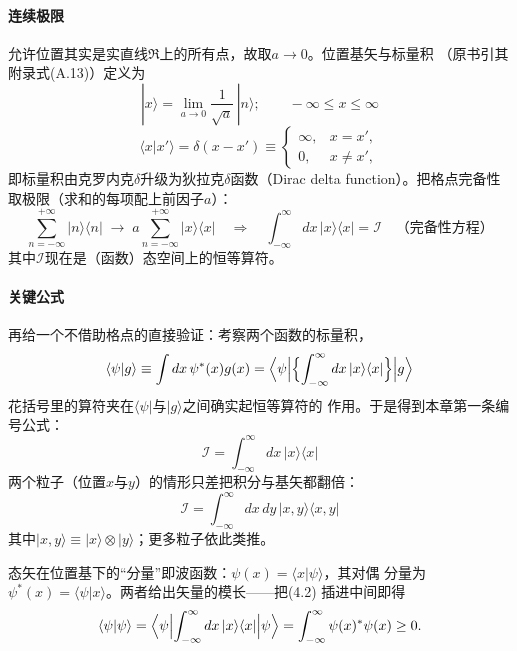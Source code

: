 \paragraph{连续极限}
允许位置其实是实直线$\Re$上的所有点，故取$a\to0$。位置基矢与标量积
（原书引其附录式(A.13)）定义为
\begin{equation*}
|x\rangle=\lim_{a\to0}\frac{1}{\sqrt{a}}\,|n\rangle;\qquad
-\infty\leq x\leq\infty
\end{equation*}
\begin{equation*}
\langle x|x'\rangle=\delta(x-x')\equiv
\begin{cases}
\infty, & x=x',\\
0, & x\neq x',
\end{cases}
\end{equation*}
即标量积由克罗内克$\delta$升级为狄拉克$\delta$函数（Dirac delta
function）。把格点完备性取极限（求和的每项配上前因子$a$）：
\begin{equation*}
\sum_{n=-\infty}^{+\infty}|n\rangle\langle n|
\;\to\;
a\sum_{n=-\infty}^{+\infty}|x\rangle\langle x|
\quad\Longrightarrow\quad
\int_{-\infty}^{\infty}dx\,|x\rangle\langle x|=\mathcal{I}
\quad\text{（完备性方程）}
\end{equation*}
其中$\mathcal{I}$现在是（函数）态空间上的恒等算符。

\paragraph{关键公式}
再给一个不借助格点的直接验证：考察两个函数的标量积，
\begin{equation*}
\langle\psi|g\rangle\equiv\int dx\,\psi^{*}(x)g(x)
=\Bigl\langle\psi\Bigl|
\Bigl\{\int_{-\infty}^{\infty}dx\,|x\rangle\langle x|\Bigr\}
\Bigr|g\Bigr\rangle
\end{equation*}
花括号里的算符夹在$\langle\psi|$与$|g\rangle$之间确实起恒等算符的
作用。于是得到本章第一条编号公式：
\begin{equation*}
\mathcal{I}=\int_{-\infty}^{\infty}dx\,|x\rangle\langle x|
\tag{4.2}
\end{equation*}
两个粒子（位置$x$与$y$）的情形只差把积分与基矢都翻倍：
\begin{equation*}
\mathcal{I}=\int_{-\infty}^{\infty}dx\,dy\,|x,y\rangle\langle x,y|
\tag{4.3}
\end{equation*}
其中$|x,y\rangle\equiv|x\rangle\otimes|y\rangle$；更多粒子依此类推。

态矢在位置基下的“分量”即波函数：$\psi(x)=\langle x|\psi\rangle$，其对偶
分量为$\psi^{*}(x)=\langle\psi|x\rangle$。两者给出矢量的模长——把(4.2)
插进中间即得
\begin{equation*}
\langle\psi|\psi\rangle
=\Bigl\langle\psi\Bigl|\int_{-\infty}^{\infty}dx\,|x\rangle\langle x|
\Bigr|\psi\Bigr\rangle
=\int_{-\infty}^{\infty}\psi(x)^{*}\psi(x)\geq0.
\end{equation*}

